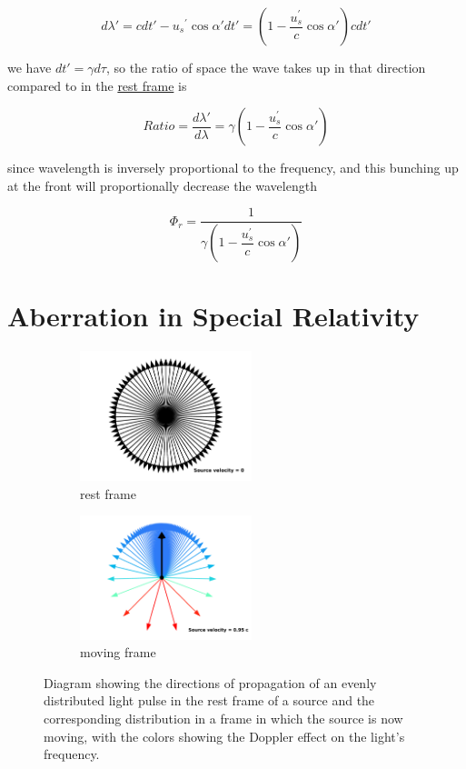 \begin{equation}
	{d\lambda{'}} = {c}{dt{'}}-{u_{s}}^{'} \cos\alpha{'} {dt{'}} = (1-\frac{u_{s}^{'}}{c}\cos\alpha{'})cdt{'}
\end{equation}

we have ${dt{'}} = {\gamma} {d\tau}$, so the ratio of space the wave takes up in that direction compared to in the \hyperlink{def-proper-frame}{rest frame} is

\begin{equation}
	Ratio = \frac{d\lambda{'}}{d\lambda} = {\gamma} \left(1-\dfrac{u_{s}^{'}}{c} \cos\alpha{'} \right)
\end{equation}

since wavelength is inversely proportional to the frequency, and this bunching up at the front will proportionally decrease the wavelength

\begin{equation}
	\Phi_{r} = \frac{1}{ {\gamma} \left(1-\dfrac{u_{s}^{'}}{c} \cos\alpha{'} \right)}
\end{equation}

\section{Aberration in Special Relativity} \label{sect: Aberration in Special Relativity}

\begin{figure}[ht]
	\begin{subfigure}{.49\textwidth}
		\centering
		\includegraphics[width = 5cm]{images/pdf/Aberrated_velocities_restframe.pdf}
		\caption{rest frame}
	\end{subfigure}
	\begin{subfigure}{.49\textwidth}
		\centering
		\includegraphics[width = 5cm]{images/pdf/Aberrated_velocities.pdf}
		\caption{moving frame}
	\end{subfigure}
	\caption{Diagram showing the directions of propagation of an evenly distributed light pulse in the rest frame of a source and the corresponding distribution in a frame in which the source is now moving, with the colors showing the Doppler effect on the light's frequency.}
	\label{fig: aberrated emitted light}
\end{figure}

